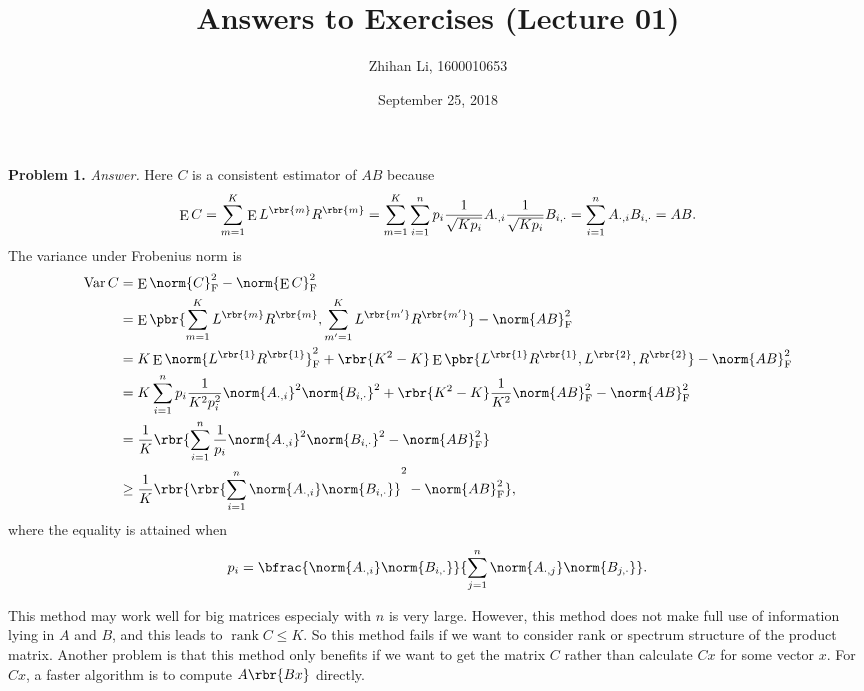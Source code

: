 \documentclass[english, nochinese]{pnote}
\title{Answers to Exercises (Lecture 01)}
\author{Zhihan Li, 1600010653}
\date{September 25, 2018}
\DeclareMathOperator\ope{\mathrm{E}}
\DeclareMathOperator\opvar{\mathrm{Var}}
\DeclareMathOperator\oprank{\mathrm{rank}}
\begin{document}
\maketitle

\textbf{Problem 1.} \textit{Answer.} Here $C$ is a consistent estimator of $ A B $ because
\begin{equation}
\ope C = \sum_{ m = 1 }^K \ope L^{\rbr{m}} R^{\rbr{m}} = \sum_{ m = 1 }^K \sum_{ i = 1 }^n p_i \frac{1}{\sqrt{ K p_i }} A_{ \cdot, i } \frac{1}{\sqrt{ K p_i }} B_{ i, \cdot } = \sum_{ i = 1 }^n A_{ \cdot, i } B_{ i, \cdot } = A B.
\end{equation}
The variance under Frobenius norm is
\begin{equation}
\begin{split}
\opvar C &= \ope \norm{C}_{\text{F}}^2 - \norm{ \ope C }_{\text{F}}^2 \\
&= \ope \pbr{ \sum_{ m = 1 }^K L^{\rbr{m}} R^{\rbr{m}}, \sum_{ m' = 1 }^K L^{\rbr{m'}} R^{\rbr{m'}} } - \norm{ A B }_{\text{F}}^2 \\
&= K \ope \norm{ L^{\rbr{1}} R^{\rbr{1}} }_{\text{F}}^2 + \rbr{ K^2 - K } \ope \pbr{ L^{\rbr{1}} R^{\rbr{1}}, L^{\rbr{2}}, R^{\rbr{2}} } -\norm{ A B }_{\text{F}}^2 \\
&= K \sum_{ i = 1 }^n p_i \frac{1}{ K^2  p_i^2} \norm{A_{ \cdot, i }}^2 \norm{B_{ i, \cdot }}^2 + \rbr{ K^2 - K } \frac{1}{K^2} \norm{ A B }_{\text{F}}^2 - \norm{ A B }_{\text{F}}^2 \\
&= \frac{1}{K} \rbr{ \sum_{ i = 1 }^n \frac{1}{p_i} \norm{A_{ \cdot, i }}^2 \norm{B_{ i, \cdot }}^2 - \norm{ A B }_{\text{F}}^2 } \\
&\ge \frac{1}{K} \rbr{ \rbr{ \sum_{ i = 1 }^n \norm{A_{ \cdot, i }} \norm{B_{ i, \cdot }} }^2 - \norm{ A B }_{\text{F}}^2 },
\end{split}
\end{equation}
where the equality is attained when
\begin{equation}
p_i = \bfrac{ \norm{A_{ \cdot, i }} \norm{B_{ i, \cdot }} }{ \sum_{ j = 1 }^n \norm{A_{ \cdot, j }} \norm{B_{ j, \cdot }} }.
\end{equation}

This method may work well for big matrices especialy with $n$ is very large. However, this method does not make full use of information lying in $A$ and $B$, and this leads to $ \oprank C \le K $. So this method fails if we want to consider rank or spectrum structure of the product matrix. Another problem is that this method only benefits if we want to get the matrix $C$ rather than calculate $ C x $ for some vector $x$. For $ C x $, a faster algorithm is to compute $ A \rbr{ B x } $ directly.
\end{document}
